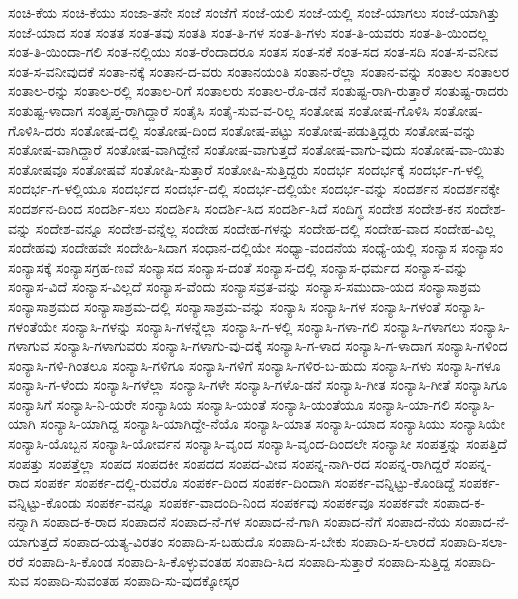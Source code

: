 ಸಂಚಿ-ಕೆಯ
ಸಂಚಿ-ಕೆಯು
ಸಂಜಾ-ತನೇ
ಸಂಜೆ
ಸಂಜೆಗೆ
ಸಂಜೆ-ಯಲಿ
ಸಂಜೆ-ಯಲ್ಲಿ
ಸಂಜೆ-ಯಾಗಲು
ಸಂಜೆ-ಯಾಗಿತ್ತು
ಸಂಜೆ-ಯಾದ
ಸಂತ
ಸಂತತ
ಸಂತ-ತವು
ಸಂತತಿ
ಸಂತ-ತಿ-ಗಳ
ಸಂತ-ತಿ-ಗಳು
ಸಂತ-ತಿ-ಯವರು
ಸಂತ-ತಿ-ಯಿಂದಲ್ಲ
ಸಂತ-ತಿ-ಯಿಂದಾ-ಗಲಿ
ಸಂತ-ನಲ್ಲಿಯು
ಸಂತ-ರೆಂದಾದರೂ
ಸಂತಸ
ಸಂತ-ಸಕೆ
ಸಂತ-ಸದ
ಸಂತ-ಸದಿ
ಸಂತ-ಸ-ವನೀವ
ಸಂತ-ಸ-ವನೀವುದಕೆ
ಸಂತಾ-ನಕ್ಕೆ
ಸಂತಾನ-ದ-ವರು
ಸಂತಾನಯಂತಿ
ಸಂತಾನ-ರೆಲ್ಲಾ
ಸಂತಾನ-ವನ್ನು
ಸಂತಾಲ
ಸಂತಾಲರ
ಸಂತಾಲ-ರನ್ನು
ಸಂತಾಲ-ರಲ್ಲಿ
ಸಂತಾಲ-ರಿಗೆ
ಸಂತಾಲರು
ಸಂತಾಲ-ರೊ-ಡನೆ
ಸಂತುಷ್ಟ-ರಾಗಿ-ರುತ್ತಾರೆ
ಸಂತುಷ್ಟ-ರಾದರು
ಸಂತುಷ್ಟ-ಳಾದಾಗ
ಸಂತೃಪ್ತ-ರಾಗಿದ್ದಾರೆ
ಸಂತೈಸಿ
ಸಂತೈ-ಸುವ-ವ-ರಿಲ್ಲ
ಸಂತೋಷ
ಸಂತೋಷ-ಗೊಳಿಸಿ
ಸಂತೋಷ-ಗೊಳಿಸಿ-ದರು
ಸಂತೋಷ-ದಲ್ಲಿ
ಸಂತೋಷ-ದಿಂದ
ಸಂತೋಷ-ಪಟ್ಟು
ಸಂತೋಷ-ಪಡುತ್ತಿದ್ದರು
ಸಂತೋಷ-ವನ್ನು
ಸಂತೋಷ-ವಾಗಿದ್ದಾರೆ
ಸಂತೋಷ-ವಾಗಿದ್ದೇನೆ
ಸಂತೋಷ-ವಾಗುತ್ತದೆ
ಸಂತೋಷ-ವಾಗು-ವುದು
ಸಂತೋಷ-ವಾ-ಯಿತು
ಸಂತೋಷವೂ
ಸಂತೋಷವೆ
ಸಂತೋಷಿ-ಸುತ್ತಾರೆ
ಸಂತೋಷಿ-ಸುತ್ತಿದ್ದರು
ಸಂದರ್ಭ
ಸಂದರ್ಭಕ್ಕೆ
ಸಂದರ್ಭ-ಗ-ಳಲ್ಲಿ
ಸಂದರ್ಭ-ಗ-ಳಲ್ಲಿಯೂ
ಸಂದರ್ಭದ
ಸಂದರ್ಭ-ದಲ್ಲಿ
ಸಂದರ್ಭ-ದಲ್ಲಿಯೇ
ಸಂದರ್ಭ-ವನ್ನು
ಸಂದರ್ಶನ
ಸಂದರ್ಶನಕ್ಕೇ
ಸಂದರ್ಶನ-ದಿಂದ
ಸಂದರ್ಶಿ-ಸಲು
ಸಂದರ್ಶಿಸಿ
ಸಂದರ್ಶಿ-ಸಿದ
ಸಂದರ್ಶಿ-ಸಿದೆ
ಸಂದಿಗ್ಧ
ಸಂದೇಶ
ಸಂದೇಶ-ಕನ
ಸಂದೇಶ-ವನ್ನು
ಸಂದೇಶ-ವನ್ನೂ
ಸಂದೇಶ-ವನ್ನೆಲ್ಲ
ಸಂದೇಹ
ಸಂದೇಹ-ಗಳನ್ನು
ಸಂದೇಹ-ದಲ್ಲಿ
ಸಂದೇಹ-ವಾದ
ಸಂದೇಹ-ವಿಲ್ಲ
ಸಂದೇಹವು
ಸಂದೇಹವೇ
ಸಂದೇಹಿ-ಸಿದಾಗ
ಸಂಧಾನ-ದಲ್ಲಿಯೇ
ಸಂಧ್ಯಾ-ವಂದನೆಯ
ಸಂಧ್ಯೆ-ಯಲ್ಲಿ
ಸಂನ್ಯಾಸ
ಸಂನ್ಯಾಸಂ
ಸಂನ್ಯಾಸಕ್ಕೆ
ಸಂನ್ಯಾಸಗ್ರಹ-ಣವೆ
ಸಂನ್ಯಾಸದ
ಸಂನ್ಯಾಸ-ದಂತೆ
ಸಂನ್ಯಾಸ-ದಲ್ಲಿ
ಸಂನ್ಯಾಸ-ಧರ್ಮದ
ಸಂನ್ಯಾಸ-ವನ್ನು
ಸಂನ್ಯಾಸ-ವಿದೆ
ಸಂನ್ಯಾಸ-ವಿಲ್ಲದೆ
ಸಂನ್ಯಾಸ-ವೆಂದು
ಸಂನ್ಯಾಸವ್ರತ-ವನ್ನು
ಸಂನ್ಯಾಸ-ಸಮುದಾ-ಯದ
ಸಂನ್ಯಾಸಾಶ್ರಮ
ಸಂನ್ಯಾಸಾಶ್ರಮದ
ಸಂನ್ಯಾಸಾಶ್ರಮ-ದಲ್ಲಿ
ಸಂನ್ಯಾಸಾಶ್ರಮ-ವನ್ನು
ಸಂನ್ಯಾಸಿ
ಸಂನ್ಯಾಸಿ-ಗಳ
ಸಂನ್ಯಾಸಿ-ಗಳಂತೆ
ಸಂನ್ಯಾಸಿ-ಗಳಂತೆಯೇ
ಸಂನ್ಯಾಸಿ-ಗಳನ್ನು
ಸಂನ್ಯಾಸಿ-ಗಳನ್ನೆಲ್ಲಾ
ಸಂನ್ಯಾಸಿ-ಗ-ಳಲ್ಲಿ
ಸಂನ್ಯಾಸಿ-ಗಳಾ-ಗಲಿ
ಸಂನ್ಯಾಸಿ-ಗಳಾಗಲು
ಸಂನ್ಯಾಸಿ-ಗಳಾಗುವ
ಸಂನ್ಯಾಸಿ-ಗಳಾಗುವರು
ಸಂನ್ಯಾಸಿ-ಗಳಾಗು-ವು-ದಕ್ಕೆ
ಸಂನ್ಯಾಸಿ-ಗ-ಳಾದ
ಸಂನ್ಯಾಸಿ-ಗ-ಳಾದಾಗ
ಸಂನ್ಯಾಸಿ-ಗಳಿಂದ
ಸಂನ್ಯಾಸಿ-ಗಳಿ-ಗಿಂತಲೂ
ಸಂನ್ಯಾಸಿ-ಗಳಿಗೂ
ಸಂನ್ಯಾಸಿ-ಗಳಿಗೆ
ಸಂನ್ಯಾಸಿ-ಗಳಿರ-ಬ-ಹುದು
ಸಂನ್ಯಾಸಿ-ಗಳು
ಸಂನ್ಯಾಸಿ-ಗಳೂ
ಸಂನ್ಯಾಸಿ-ಗ-ಳೆಂದು
ಸಂನ್ಯಾಸಿ-ಗಳೆಲ್ಲಾ
ಸಂನ್ಯಾಸಿ-ಗಳೇ
ಸಂನ್ಯಾಸಿ-ಗಳೊ-ಡನೆ
ಸಂನ್ಯಾಸಿ-ಗೀತ
ಸಂನ್ಯಾಸಿ-ಗೀತೆ
ಸಂನ್ಯಾಸಿಗೂ
ಸಂನ್ಯಾಸಿಗೆ
ಸಂನ್ಯಾಸಿ-ನಿ-ಯರೇ
ಸಂನ್ಯಾಸಿಯ
ಸಂನ್ಯಾಸಿ-ಯಂತೆ
ಸಂನ್ಯಾಸಿ-ಯಂತೆಯೂ
ಸಂನ್ಯಾಸಿ-ಯಾ-ಗಲಿ
ಸಂನ್ಯಾಸಿ-ಯಾಗಿ
ಸಂನ್ಯಾಸಿ-ಯಾಗಿದ್ದ
ಸಂನ್ಯಾಸಿ-ಯಾಗಿದ್ದೇ-ನೆಯೊ
ಸಂನ್ಯಾಸಿ-ಯಾತ
ಸಂನ್ಯಾಸಿ-ಯಾದ
ಸಂನ್ಯಾಸಿಯು
ಸಂನ್ಯಾಸಿಯೇ
ಸಂನ್ಯಾಸಿ-ಯೊಬ್ಬನ
ಸಂನ್ಯಾಸಿ-ಯೋರ್ವನ
ಸಂನ್ಯಾಸಿ-ವೃಂದ
ಸಂನ್ಯಾಸಿ-ವೃಂದ-ದಿಂದಲೇ
ಸಂನ್ಯಾಸೀ
ಸಂಪತ್ತನ್ನು
ಸಂಪತ್ತಿದೆ
ಸಂಪತ್ತು
ಸಂಪತ್ತೆಲ್ಲಾ
ಸಂಪದ
ಸಂಪದಕೀ
ಸಂಪದದ
ಸಂಪದ-ವೀವ
ಸಂಪನ್ನ-ನಾಗಿ-ರದ
ಸಂಪನ್ನ-ರಾಗಿದ್ದರೆ
ಸಂಪನ್ನ-ರಾದ
ಸಂಪರ್ಕ
ಸಂಪರ್ಕ-ದಲ್ಲಿ-ರುವರೊ
ಸಂಪರ್ಕ-ದಿಂದ
ಸಂಪರ್ಕ-ದಿಂದಾಗಿ
ಸಂಪರ್ಕ-ವನ್ನಿಟ್ಟು-ಕೊಂಡಿದ್ದೆ
ಸಂಪರ್ಕ-ವನ್ನಿಟ್ಟು-ಕೊಂಡು
ಸಂಪರ್ಕ-ವನ್ನೂ
ಸಂಪರ್ಕ-ವಾದಂದಿ-ನಿಂದ
ಸಂಪರ್ಕವು
ಸಂಪರ್ಕವೂ
ಸಂಪರ್ಕವೇ
ಸಂಪಾದ-ಕ-ನನ್ನಾಗಿ
ಸಂಪಾದ-ಕ-ರಾದ
ಸಂಪಾದನೆ
ಸಂಪಾದ-ನೆ-ಗಳ
ಸಂಪಾದ-ನೆ-ಗಾಗಿ
ಸಂಪಾದ-ನೆಗೆ
ಸಂಪಾದ-ನೆಯ
ಸಂಪಾದ-ನೆ-ಯಾಗುತ್ತದೆ
ಸಂಪಾದ-ಯತ್ಯ-ವಿರತಂ
ಸಂಪಾದಿ-ಸ-ಬಹುದೊ
ಸಂಪಾದಿ-ಸ-ಬೇಕು
ಸಂಪಾದಿ-ಸ-ಲಾರದೆ
ಸಂಪಾದಿ-ಸಲಾ-ರರೆ
ಸಂಪಾದಿ-ಸಿ-ಕೊಂಡ
ಸಂಪಾದಿ-ಸಿ-ಕೊಳ್ಳುವಂತಹ
ಸಂಪಾದಿ-ಸಿದ
ಸಂಪಾದಿ-ಸುತ್ತಾರೆ
ಸಂಪಾದಿ-ಸುತ್ತಿದ್ದ
ಸಂಪಾದಿ-ಸುವ
ಸಂಪಾದಿ-ಸುವಂತಹ
ಸಂಪಾದಿ-ಸು-ವುದಕ್ಕೋಸ್ಕರ

